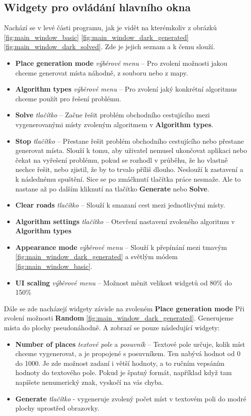\subsection{Widgety pro ovládání hlavního okna}
Nachází se v levé části programu, jak je vidět na kterémkoliv z obrázků \ref{fig:main_window_basic} \ref{fig:main_window_dark_generated} \ref{fig:main_window_dark_solved}. Zde je jejich seznam a k čemu slouží. 
\begin{itemize}
\item \textbf{Place generation mode} \textit{výběrové menu} -- Pro zvolení možnosti jakou chceme generovat místa náhodně, z souboru nebo z mapy.
\item \textbf{Algorithm types} \textit{výběrové menu} -- Pro zvolení jaký konkrétní algoritmus chceme použít pro řešení problému.
\item \textbf{Solve} \textit{tlačítko} -- Začne řešit problém obchodního cestujícího mezi vygenerovanými místy zvoleným algoritmem v \textbf{Algorithm types}.
\item \textbf{Stop} \textit{tlačítko} -- Přestane řešit problém obchodního cestujícího
nebo přestane generovat místa. Slouží k tomu, aby uživatel nemusel ukončovat aplikaci nebo čekat na vyřešení problému, pokud se rozhodl v průběhu, že ho vlastně nechce řešit, nebo zjistil, že by to trvalo příliš dlouho. Neslouží k zastavení a k následnému spuštění. Sice se po zmáčknutí tlačítka práce nesmaže. Ale to nastane až po dalším kliknutí na tlačítko \textbf{Generate} nebo \textbf{Solve}. 
\item \textbf{Clear roads} \textit{tlačítko} -- Slouží k smazaní cest mezi jednotlivými místy.
\item \textbf{Algorithm settings} \textit{tlačítko} -- Otevření nastavení zvoleného algoritmu v \textbf{Algorithm types}
\item \textbf{Appearance mode} \textit{výběrové menu} -- Slouží k přepínání mezi tmavým \ref{fig:main_window_dark_generated}  a světlým módem \ref{fig:main_window_basic}. 
\item \textbf{UI scaling} \textit{výběrové menu} -- Možnost měnit velikost widgetů od 80\% do 150\%
\end{itemize}


Dále se zde nacházejí widgety závisle na zvoleném \textbf{Place generation mode} Při zvolení možnosti \textbf{Random} \ref{fig:main_window_dark_generated}. Generujeme místa do plochy pseudonáhodně. A zobrazí se pouze následující widgety:
\begin{itemize}
\item \textbf{Number of places} \textit{textové pole} a \textit{posuvník} -- Textové pole určuje, kolik míst chceme vygenerovat, a je propojené s posuvníkem. Ten nabývá hodnot od 0 do 1000. Je zde možnost zadaní i větší hodnoty, a to ručním vepsáním hodnoty do textového pole. Pokud je špatný formát, například když tam napíšete nenumerický znak, vyskočí na vás chyba.
\item \textbf{Generate} \textit{tlačítko} - vygeneruje zvolený počet míst v textovém poli do modré plochy uprostřed obrazovky. 
\end{itemize}

